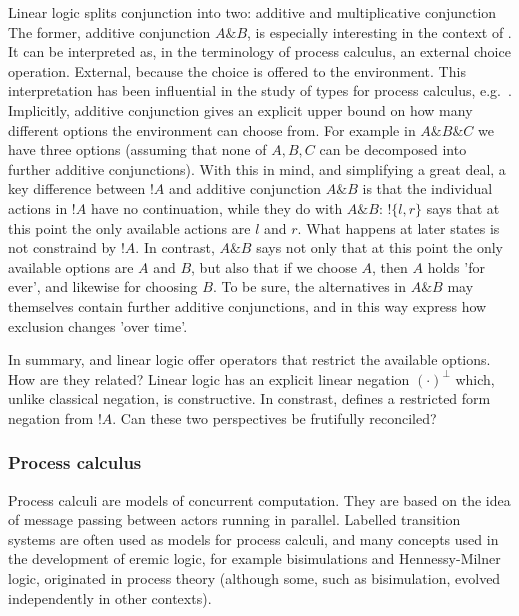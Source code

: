 Linear logic splits conjunction into two: additive and multiplicative
conjunction The former, additive conjunction $A \& B$, is especially
interesting in the context of \ELFULL{}. It can be interpreted
\cite{AbramskyS:comintoll} as, in the terminology of process calculus,
an external choice operation. External, because the choice is offered
to the environment.  This interpretation has been influential in the
study of types for process calculus,
e.g.~\cite{HondaK:unitypsfsifLONG,TakeuchiK:intbaslaits,HondaK:lanpriatdfscbp}.
Implicitly, additive conjunction gives an explicit upper bound on how
many different options the environment can choose from. For example in
$A \& B \& C$ we have three options (assuming that none of $A, B, C$
can be decomposed into further additive conjunctions).  With this in
mind, and simplifying a great deal, a key difference between $!A$ and
additive conjunction $A \& B$ is that the individual actions in $!A$
have no continuation, while they do with $A \& B$: $!\{l, r\}$ says
that at this point the only available actions are $l$ and $r$. What
happens at later states is not constraind by $!A$.  In contrast, $A \&
B$ says not only that at this point the only available options are $A$
and $B$, but also that if we choose $A$, then $A$ holds 'for ever',
and likewise for choosing $B$. To be sure, the alternatives in $A \&
B$ may themselves contain further additive conjunctions, and in this
way express how exclusion changes 'over time'.

In summary, \ELABR{} and linear logic offer  operators that restrict
the available options. How are they related? Linear logic has an
explicit linear negation $(\cdot)^{\bot}$ which, unlike classical
negation, is constructive. In constrast, \ELABR{} defines a restricted
form negation from $!A$. Can these two perspectives be frutifully
reconciled?

\subsubsection{Process calculus}

Process calculi are models of concurrent computation.  They are based
on the idea of message passing between actors running in parallel.
Labelled transition systems are often used as models for process
calculi, and many concepts used in the development of eremic logic,
for example bisimulations and Hennessy-Milner logic, originated in
process theory (although some, such as bisimulation, evolved
independently in other contexts).

